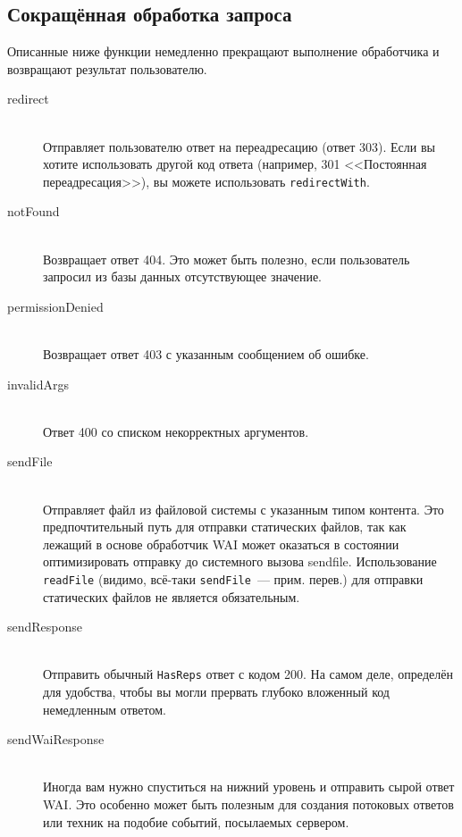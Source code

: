 \subsection{Сокращённая обработка запроса}
Описанные ниже функции немедленно прекращают выполнение обработчика и
возвращают результат пользователю.
\begin{description}
\item[redirect] \hfill \\
Отправляет пользователю ответ на переадресацию (ответ 303). Если вы
хотите использовать другой код ответа (например, 301 <<Постоянная
переадресация>>), вы можете использовать \lstinline!redirectWith!.

\item[notFound] \hfill \\
Возвращает ответ 404. Это может быть полезно, если пользователь
запросил из базы данных отсутствующее значение.

\item[permissionDenied] \hfill \\
Возвращает ответ 403 с указанным сообщением об ошибке.

\item[invalidArgs] \hfill \\
Ответ 400 со списком некорректных аргументов.

\item[sendFile] \hfill \\
Отправляет файл из файловой системы с указанным типом контента. Это
предпочтительный путь для отправки статических файлов, так как лежащий
в основе обработчик WAI может оказаться в состоянии оптимизировать
отправку до системного вызова sendfile. Использование
\lstinline!readFile! (видимо, всё-таки \lstinline!sendFile!~---
прим. перев.) для отправки статических файлов не является
обязательным.

\item[sendResponse] \hfill \\
Отправить обычный \lstinline!HasReps! ответ с кодом 200. На самом
деле, определён для удобства, чтобы вы могли прервать глубоко
вложенный код немедленным ответом.

\item[sendWaiResponse] \hfill \\
Иногда вам нужно спуститься на нижний уровень и отправить сырой ответ
WAI. Это особенно может быть полезным для создания потоковых ответов
или техник на подобие событий, посылаемых сервером.
\end{description}

